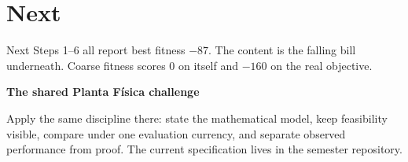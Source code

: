 
\section{Next}

\begin{frame}{Next}
Steps 1--6 all report best fitness \(-87\). The content is the falling bill underneath. Coarse fitness scores 0 on itself and \(-160\) on the real objective.

\vspace{0.8em}
\textbf{The shared Planta F\'isica challenge}

Apply the same discipline there: state the mathematical model, keep feasibility visible, compare under one evaluation currency, and separate observed performance from proof. The current specification lives in the semester repository.
\end{frame}

